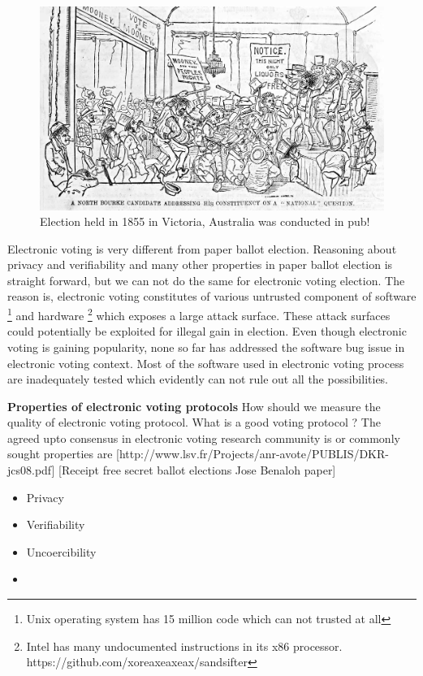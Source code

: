  
 \begin{figure}[htb]
	\begin{center}
	\includegraphics[scale=0.25]{NorthBourke.jpg}
	\caption{Election held in 1855 in Victoria, Australia 
	  was conducted in pub!}
	\end{center}
  \end{figure}   
  
 Electronic voting is very different from paper ballot election. 
 Reasoning 
 about privacy and verifiability and many other properties 
 in paper ballot election 
 is straight forward, but we can not do the same for 
 electronic voting election. The reason is, electronic voting constitutes 
 of various untrusted component of software
 \footnote{Unix operating system has 15 million code which can not 
 trusted at all} and hardware
 \footnote{Intel has many undocumented instructions in its x86 
 processor. https://github.com/xoreaxeaxeax/sandsifter} which 
 exposes a large attack surface. These attack surfaces could 
 potentially be exploited for illegal gain in election. 
 Even though electronic voting is gaining popularity, none so far has 
 addressed the software bug issue in electronic voting context. 
 Most of the software used in electronic voting process are 
 inadequately tested which evidently can not rule out all 
 the possibilities.

 \textbf{Properties of electronic voting protocols}
  How should we measure the quality of electronic voting protocol. 
  What is a good voting protocol ? 
  The agreed upto consensus in electronic voting research
  community is or commonly sought properties are  
  [http://www.lsv.fr/Projects/anr-avote/PUBLIS/DKR-jcs08.pdf]
  [Receipt free secret ballot elections Jose Benaloh paper]
  
 \begin{itemize}
 \item Privacy 
 \item Verifiability
 \item Uncoercibility
 \item 
 \end{itemize} 
 
